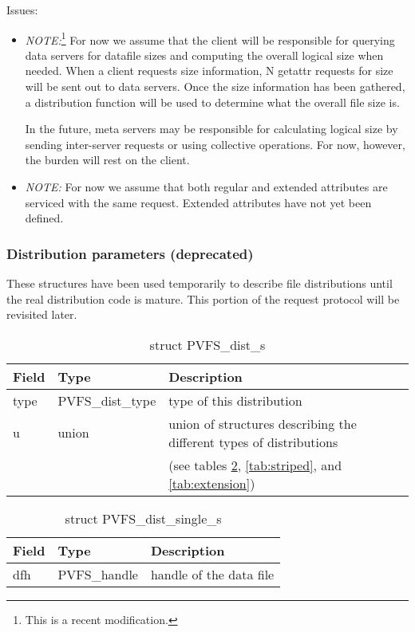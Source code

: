 \documentclass[11pt, letterpaper]{article} %
\begin{document}
Issues:
\begin{itemize}
\item \emph{NOTE:}\footnote{This is a recent modification.}
For now we assume that the client will be responsible
for querying data servers for datafile sizes and computing the overall
logical size when needed.  When a client requests size information, N
getattr requests for size will be sent out to data servers.  Once the
size information has been gathered, a distribution function will be used
to determine what the overall file size is.

In the future, meta servers may be responsible for calculating logical
size by sending inter-server requests or using collective operations.
For now, however, the burden will rest on the client.

\item \emph{NOTE:}  For now we assume that both regular and extended
attributes are serviced with the same request.   Extended attributes
have not yet been defined.
\end{itemize}

\subsubsection{Distribution parameters (deprecated)}

These structures have been used temporarily to describe file
distributions until the real distribution code is mature.  This portion of
the request protocol will be revisited later.

\begin{table}[H]
\begin{tabular}{|l|l|l|}
\hline
Field & Type & Description \\
\hline
\hline
type & PVFS\_dist\_type & type of this distribution\\
\hline
u & union & union of structures describing the different types of
distributions\\
 & & (see tables \ref{tab:single}, \ref{tab:striped}, and
\ref{tab:extension})\\
\hline
\end{tabular}
\caption{struct PVFS\_dist\_s \label{tab:dist}}
\end{table}

\begin{table}[H]
\begin{tabular}{|l|l|l|}
\hline
Field & Type & Description \\
\hline
\hline
dfh & PVFS\_handle & handle of the data file\\
\hline
\end{tabular}
\caption{struct PVFS\_dist\_single\_s \label{tab:single}}
\end{table}
\end{document}
